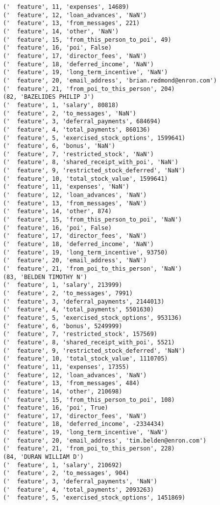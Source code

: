 \begin{verbatim}
('  feature', 11, 'expenses', 14689)
('  feature', 12, 'loan_advances', 'NaN')
('  feature', 13, 'from_messages', 221)
('  feature', 14, 'other', 'NaN')
('  feature', 15, 'from_this_person_to_poi', 49)
('  feature', 16, 'poi', False)
('  feature', 17, 'director_fees', 'NaN')
('  feature', 18, 'deferred_income', 'NaN')
('  feature', 19, 'long_term_incentive', 'NaN')
('  feature', 20, 'email_address', 'brian.redmond@enron.com')
('  feature', 21, 'from_poi_to_this_person', 204)
(82, 'BAZELIDES PHILIP J')
('  feature', 1, 'salary', 80818)
('  feature', 2, 'to_messages', 'NaN')
('  feature', 3, 'deferral_payments', 684694)
('  feature', 4, 'total_payments', 860136)
('  feature', 5, 'exercised_stock_options', 1599641)
('  feature', 6, 'bonus', 'NaN')
('  feature', 7, 'restricted_stock', 'NaN')
('  feature', 8, 'shared_receipt_with_poi', 'NaN')
('  feature', 9, 'restricted_stock_deferred', 'NaN')
('  feature', 10, 'total_stock_value', 1599641)
('  feature', 11, 'expenses', 'NaN')
('  feature', 12, 'loan_advances', 'NaN')
('  feature', 13, 'from_messages', 'NaN')
('  feature', 14, 'other', 874)
('  feature', 15, 'from_this_person_to_poi', 'NaN')
('  feature', 16, 'poi', False)
('  feature', 17, 'director_fees', 'NaN')
('  feature', 18, 'deferred_income', 'NaN')
('  feature', 19, 'long_term_incentive', 93750)
('  feature', 20, 'email_address', 'NaN')
('  feature', 21, 'from_poi_to_this_person', 'NaN')
(83, 'BELDEN TIMOTHY N')
('  feature', 1, 'salary', 213999)
('  feature', 2, 'to_messages', 7991)
('  feature', 3, 'deferral_payments', 2144013)
('  feature', 4, 'total_payments', 5501630)
('  feature', 5, 'exercised_stock_options', 953136)
('  feature', 6, 'bonus', 5249999)
('  feature', 7, 'restricted_stock', 157569)
('  feature', 8, 'shared_receipt_with_poi', 5521)
('  feature', 9, 'restricted_stock_deferred', 'NaN')
('  feature', 10, 'total_stock_value', 1110705)
('  feature', 11, 'expenses', 17355)
('  feature', 12, 'loan_advances', 'NaN')
('  feature', 13, 'from_messages', 484)
('  feature', 14, 'other', 210698)
('  feature', 15, 'from_this_person_to_poi', 108)
('  feature', 16, 'poi', True)
('  feature', 17, 'director_fees', 'NaN')
('  feature', 18, 'deferred_income', -2334434)
('  feature', 19, 'long_term_incentive', 'NaN')
('  feature', 20, 'email_address', 'tim.belden@enron.com')
('  feature', 21, 'from_poi_to_this_person', 228)
(84, 'DURAN WILLIAM D')
('  feature', 1, 'salary', 210692)
('  feature', 2, 'to_messages', 904)
('  feature', 3, 'deferral_payments', 'NaN')
('  feature', 4, 'total_payments', 2093263)
('  feature', 5, 'exercised_stock_options', 1451869)

\end{verbatim}
